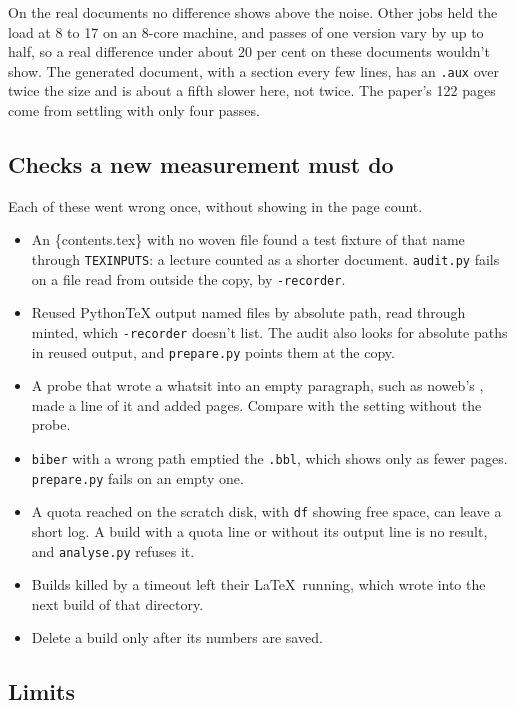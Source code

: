On the real documents no difference shows above the noise.
Other jobs held the load at 8 to 17 on an 8-core machine, and passes of one version vary by up to half,
so a real difference under about 20 per cent on these documents wouldn't show.
The generated document, with a section every few lines, has an \texttt{.aux} over twice the size and is
about a fifth slower here, not twice.
The paper's 122 pages come from settling with only four passes.

\subsection{Checks a new measurement must do}

Each of these went wrong once, without showing in the page count.
\begin{itemize}
\item An \{contents.tex\} with no woven file found a test fixture of that name
  through \texttt{TEXINPUTS}: a lecture counted as a shorter document.
  \texttt{audit.py} fails on a file read from outside the copy, by \texttt{-recorder}.
\item Reused PythonTeX output named files by absolute path, read through \textsf{minted}, which
  \texttt{-recorder} doesn't list.
  The audit also looks for absolute paths in reused output, and \texttt{prepare.py} points them at the copy.
\item A probe that wrote a whatsit into an empty paragraph, such as \textsf{noweb}'s
  , made a line of it and added pages.
  Compare with the setting without the probe.
\item \texttt{biber} with a wrong path emptied the \texttt{.bbl}, which shows only as fewer pages.
  \texttt{prepare.py} fails on an empty one.
\item A quota reached on the scratch disk, with \texttt{df} showing free space, can leave a short log.
  A build with a quota line or without its output line is no result, and \texttt{analyse.py} refuses it.
\item Builds killed by a timeout left their \LaTeX\ running, which wrote into the next build of that directory.
\item Delete a build only after its numbers are saved.
\end{itemize}

\subsection{Limits}

